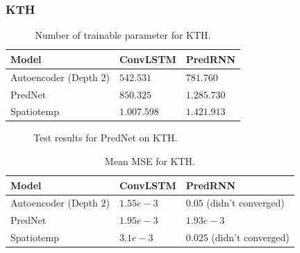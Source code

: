   \subsubsection{KTH}
   \begin{table}[H]
    \begin{center}
     \begin{tabular}{| l | l | l |}\hline
      \textbf{Model} & \textbf{ConvLSTM} & \textbf{PredRNN} \\\hline
      Autoencoder (Depth $2$) & $542.531$ & $781.760$ \\\hline
      PredNet & $850.325$ & $1.285.730$ \\\hline
      Spatiotemp & $1.007.598$ & $1.421.913$ \\\hline
     \end{tabular}
    \end{center}
    \caption{Number of trainable parameter for KTH.}
   \end{table}\noindent
   \begin{figure}[H]
   \centering
   \qquad
   \qquad
   \caption{Test results for PredNet on KTH.}
   \label{figure::prednet_kth_results}
  \end{figure}\noindent
   \begin{table}[H]
    \begin{center}
     \begin{tabular}{| l | l | l |}\hline
      \textbf{Model} & \textbf{ConvLSTM} & \textbf{PredRNN} \\\hline
      Autoencoder (Depth $2$) & $1.55e-3$ & $0.05$ (didn't converged) \\\hline
      PredNet & $1.95e-3$ & $1.93e-3$ \\\hline
      Spatiotemp & $3.1e-3$ & $0.025$ (didn't converged) \\\hline
     \end{tabular}
    \end{center}
    \caption{Mean MSE for KTH.}
   \end{table}
  
